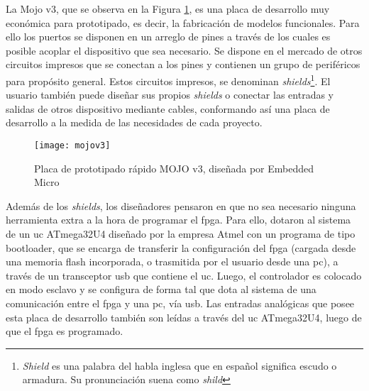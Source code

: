 La Mojo v3, que se observa en la Figura \ref{mojo}, es una placa de desarrollo muy económica para prototipado, es decir, la fabricación de modelos funcionales. Para ello los puertos se disponen en un arreglo de pines a través de los cuales es posible acoplar el dispositivo que sea necesario. Se dispone en el mercado de otros circuitos impresos que se conectan a los pines y contienen un grupo de periféricos para propósito general. Estos circuitos impresos, se denominan \textit{shields}\footnote{ \textit{Shield} es una palabra del habla inglesa que en español significa escudo o armadura. Su pronunciación suena como \textit{shild}}. El usuario también puede diseñar sus propios \textit{shields} o conectar las entradas y salidas de otros dispositivo mediante cables, conformando así una placa de desarrollo a la medida de las necesidades de cada proyecto.%

\begin{figure}[b]
	\centering
	\texttt{[image: mojov3]}
	\caption{Placa de prototipado rápido MOJO v3, diseñada por Embedded Micro}
	\label{mojo}
\end{figure}

Además de los \textit{shields}, los diseñadores pensaron en que no sea necesario ninguna herramienta extra a la hora de programar el \acrshort{fpga}. Para ello, dotaron al sistema de un \acrshort{uc} ATmega32U4 diseñado por la empresa Atmel con un programa de tipo bootloader, que se encarga de transferir la configuración del \acrshort{fpga} (cargada desde una memoria flash incorporada, o trasmitida por el usuario desde una \acrshort{pc}), a través de un transceptor \acrshort{usb} que contiene el \acrshort{uc}. Luego, el controlador es colocado en modo esclavo y se configura de forma tal que dota al sistema de una comunicación entre el \acrshort{fpga} y una \acrshort{pc}, vía \acrshort{usb}. Las entradas analógicas que posee esta placa de desarrollo también son leídas a través del \acrshort{uc} ATmega32U4, luego de que el \acrshort{fpga} es programado.%

